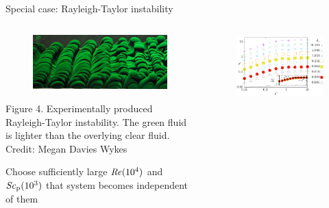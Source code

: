 \documentclass[final]{beamer} %
\newcommand\Rey{\mbox{\textit{Re}}}  %
\newcommand\Sc{\mbox{\textit{Sc}}}  %
\begin{document}
\begin{frame}[t]
\begin{block}{Special case: Rayleigh-Taylor instability}
\begin{columns}[t]
\begin{column}{0.3\paperwidth}
        \begin{figure}
            \includegraphics[width=0.3\paperwidth]{Megan.jpg}
        \end{figure}

        \vspace{-0.5cm}

        \centering \footnotesize Figure 4. Experimentally produced Rayleigh-Taylor instability. The green fluid is lighter than the overlying clear fluid. Credit: Megan Davies Wykes

        \vspace{0.5cm}

        \normalsize Choose sufficiently large $\Rey (10^{4})$ and $\Sc_{\text{p}} (10^{3})$ that system becomes independent of them \\
      \end{column}

      \begin{column}{0.3\paperwidth}

        \vspace{-0.5cm}

        \begin{figure}
          \includegraphics[width=0.3\paperwidth]{RT_dispersion.pdf}
        \end{figure}


\end{column}
\end{columns}
\end{block}
\end{frame}
\end{document}
